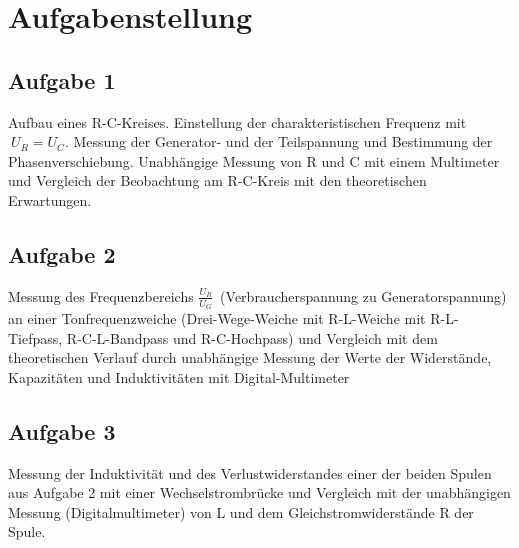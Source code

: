 \section{Aufgabenstellung}
\subsection*{Aufgabe 1}
Aufbau eines R-C-Kreises. Einstellung der charakteristischen Frequenz mit \(\ U_{R}=U_{C} \). Messung der Generator- und der Teilspannung und Bestimmung der Phasenverschiebung. Unabhängige Messung von R und C mit einem Multimeter und Vergleich der Beobachtung am R-C-Kreis mit den theoretischen Erwartungen. 

\subsection*{Aufgabe 2}
Messung des Frequenzbereichs \(\frac{U_{R}}{U_{G}}\)\ (Verbraucherspannung zu Generatorspannung) an einer Tonfrequenzweiche (Drei-Wege-Weiche mit R-L-Weiche mit R-L-Tiefpass, R-C-L-Bandpass und R-C-Hochpass) und Vergleich mit dem theoretischen Verlauf durch unabhängige Messung der Werte der Widerstände, Kapazitäten und Induktivitäten mit Digital-Multimeter

\subsection*{Aufgabe 3}
Messung der Induktivität und des Verlustwiderstandes einer der beiden Spulen aus Aufgabe 2 mit einer Wechselstrombrücke und Vergleich mit der unabhängigen Messung (Digitalmultimeter) von L und dem Gleichstromwiderstände R der Spule.

\newpage